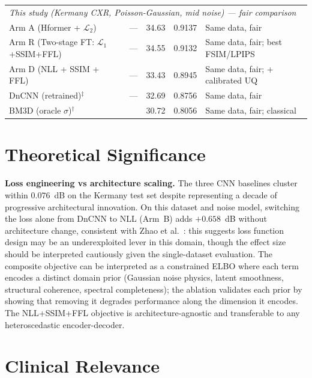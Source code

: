 \documentclass[12pt, a4paper, twoside, openright]{book}
\begin{document}
\begin{landscape}
\begin{longtable}{llccl}
\midrule
\multicolumn{5}{l}{\textit{This study (Kermany CXR, Poisson-Gaussian, mid noise) — fair comparison}} \\
Arm A (Hformer + $\mathcal{L}_2$)             & ---                          & 34.63 & 0.9137 & Same data, fair \\
Arm R (Two-stage FT: $\mathcal{L}_1$+SSIM+FFL) & ---                       & 34.55 & 0.9132 & Same data, fair; best FSIM/LPIPS \\
Arm D (NLL + SSIM + FFL)                      & ---                          & 33.43 & 0.8945 & Same data, fair; + calibrated UQ \\
DnCNN (retrained)$^\ddagger$                  & ---                          & 32.69 & 0.8756 & Same data, fair \\
BM3D (oracle $\sigma$)$^\dagger$              & \citeyear{dabov_image_2007}  & 30.72 & 0.8056 & Same data, fair; classical \\
%
\end{longtable}
\end{landscape}

\section{Theoretical Significance}
\label{sec:disc:theory}

\textbf{Loss engineering vs architecture scaling.} The three CNN baselines cluster within $0.076$~dB on the Kermany test set despite representing a decade of progressive architectural innovation. On this dataset and noise model, switching the loss alone from DnCNN to NLL (Arm~B) adds $+0.658$~dB without architecture change, consistent with Zhao et al.\ \cite{zhao_loss_2017}: this suggests loss function design may be an underexploited lever in this domain, though the effect size should be interpreted cautiously given the single-dataset evaluation. The composite objective can be interpreted as a constrained ELBO where each term encodes a distinct domain prior (Gaussian noise physics, latent smoothness, structural coherence, spectral completeness); the ablation validates each prior by showing that removing it degrades performance along the dimension it encodes. The NLL+SSIM+FFL objective is architecture-agnostic and transferable to any heteroscedastic encoder-decoder.

\section{Clinical Relevance}
\label{sec:disc:clinical}
\end{document}
